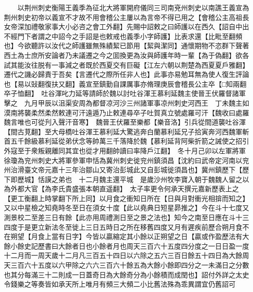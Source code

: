 　　以荆州刺史衡陽王義季為征北大將軍開府儀同三司南兗州刺史以南譙王義宣為荆州刺史初帝以義宣不才故不用會稽公主屢以為言帝不得已用之【會稽公主高祖長女帝深加禮敬家事大小必咨之會工外翻】先賜中詔敕之曰師護以在西久【詔自中出不經門下者謂之中詔今之手詔是也敕戒也義季小字師護】比表求還【比毗至翻頻也】今欲聽許以汝代之師護雖無殊績絜已節用【絜與潔同】通懷期物不恣群下聲著西土為士庶所安論者乃未議遷之今之囬換更為汝與師護年時一輩【為于偽翻】欲各試其能汝往脱有一事減之者既於西夏交有巨礙【江左六朝以荆楚為西夏夏戶雅翻】遷代之譏必歸責于吾矣【言遷代之際所任非人也】此事亦易勉耳無為使人復生評論也【易以䜴翻復扶又翻】義宣至鎮勤自課厲事亦脩理庚辰會稽長公主卒【□知兩翻卒子恤翻】　吐谷渾叱力延等請師於魏以討吐谷渾王慕利延魏主使晉王伏羅督諸軍擊之　九月甲辰以沮渠安周為都督凉河沙三州諸軍事凉州刺史河西王　丁未魏主如漠南將襲柔然柔然敕連可汗遠遁乃止敕連尋卒子吐賀真立號處羅可汗【魏收曰處羅魏言唯也可從刋入聲汗音寒】　魏晉王伏羅至樂都【樂音洛】引兵從間道襲吐谷渾【間古莧翻】至大母橋吐谷渾王慕利延大驚逃奔白蘭慕利延兄子拾寅奔河西魏軍斬首五千餘級慕利延從弟伏念等帥萬三千落降於魏【慕利延背阿柴折箭之誡使之招引外寇至于衆叛親離同其宜也從才用翻帥讀曰率降戶江翻】　冬十月己卯以左軍將軍徐瓊為兖州刺史大將軍參軍申恬為冀州刺史徙兖州鎮須昌【沈約曰武帝定河南以兖州治滑臺文帝元嘉十三年治鄒山又寄治彭城此又自彭城徙須昌也】冀州鎮歷下【歷下即歷城】恬謨之弟也　十二月魏主還平城　是歲沙州牧李寶入朝于魏魏人留之以為外都大官【為李氏貴盛張本朝直遥翻】　太子率更令何承天撰元嘉新歷表上之【更工衡翻上時掌翻下所上同】以月食之衝知日所在【日與月對衝光相揜而知之】又以中星檢之知堯時冬至日在須女十度【此以堯典日短星昴推之】今在斗十七度又測景校二至差三日有餘【此亦用周禮測日至之景之法也】知今之南至日應在斗十三四度于是更立新法冬至徙上三日五時日之所在移舊四度又月有遲疾前歷合朔月食不在朔望【月食上當有日字】今皆以贏縮定其小餘以正朔望之日【贏或作盈歷法有大餘小餘史記歷書曰大餘者日也小餘者月也周天三百六十五度四分度之一日日盈一度十二月而一周天歲十二月凡三百五十四日以六除之五六三百日餘五十四日為大餘周天三百六十五度以六甲除之六六三百六十餘五為大餘小餘即四分之一未滿日之分數也其分每滿三十二則成一日蓋奇日為大餘奇分為小餘積而成閏也】詔付外詳之太史令錢樂之等奏皆如承天所上唯月有頻三大頻二小比舊法殊為乖異謂宜仍舊詔可

